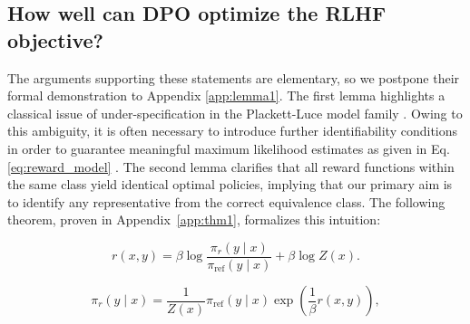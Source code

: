 \subsection{How well can DPO optimize the RLHF objective?}

The arguments supporting these statements are elementary, so we postpone their formal demonstration to Appendix \ref{app:lemma1}. The first lemma highlights a classical issue of under-specification in the Plackett-Luce model family \cite{plackett1975analysis}. Owing to this ambiguity, it is often necessary to introduce further identifiability conditions in order to guarantee meaningful maximum likelihood estimates as given in Eq. \ref{eq:reward_model} \cite{bong2022generalized}. The second lemma clarifies that all reward functions within the same class yield identical optimal policies, implying that our primary aim is to identify any representative from the correct equivalence class. The following theorem, proven in Appendix~\ref{app:thm1}, formalizes this intuition:

\begin{equation}\label{eq:main_eq}
    r(x,y) =\beta \log \frac{\pi_r(y\mid x)}{\pi_\text{ref}(y\mid x)} + \beta \log Z(x).
\end{equation}

\begin{equation}\label{eq:op_policy}
    \pi_r(y\mid x) = \frac{1}{Z(x)}\pi_\text{ref}(y\mid x)\exp\left(\frac{1}{\beta}r(x, y)\right),
\end{equation}

